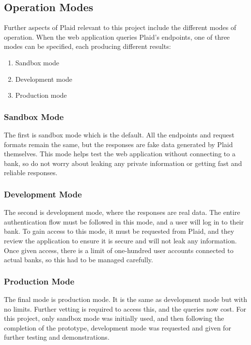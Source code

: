 \subsection{Operation Modes}
\label{sec:plaid-operation-modes}
Further aspects of Plaid relevant to this project include the different modes of operation. When the web application queries Plaid's endpoints, one of three modes can be specified, each producing different results:

\begin{enumerate}
    \item Sandbox mode
    \item Development mode
    \item Production mode
\end{enumerate}

\subsubsection{Sandbox Mode}
The first is sandbox mode which is the default. All the endpoints and request formats remain the same, but the responses are fake data generated by Plaid themselves. This mode helps test the web application without connecting to a bank, so do not worry about leaking any private information or getting fast and reliable responses.

\subsubsection{Development Mode}
The second is development mode, where the responses are real data. The entire authentication flow must be followed in this mode, and a user will log in to their bank. To gain access to this mode, it must be requested from Plaid, and they review the application to ensure it is secure and will not leak any information. Once given access, there is a limit of one-hundred user accounts connected to actual banks, so this had to be managed carefully.

\subsubsection{Production Mode}
The final mode is production mode. It is the same as development mode but with no limits. Further vetting is required to access this, and the queries now cost. For this project, only sandbox mode was initially used, and then following the completion of the prototype, development mode was requested and given for further testing and demonstrations.

